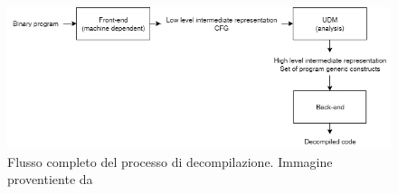 \documentclass[../main.tex]{subfiles}
\begin{document}
\begin{figure}[H]
    \centering
    \includegraphics[width = 0.90\linewidth]{../images/Decompilation.png}
    \caption{Flusso completo del processo di decompilazione. Immagine proventiente da \cite{Cifuentes1995DecompilationOB}}
\end{figure}
\end{document}

